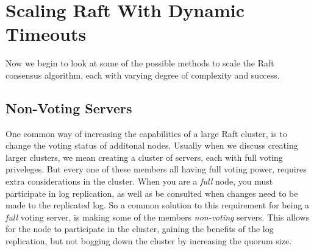 \section{Scaling Raft With Dynamic Timeouts}

Now we begin to look at some of the possible methods to scale the Raft consensus algorithm, each with varying degree of complexity and success.

\subsection{Non-Voting Servers}

One common way of increasing the capabilities of a large Raft cluster, is to change the voting status of additonal nodes.
Usually when we discuss creating larger clusters, we mean creating a cluster of servers, each with full voting priveleges.
But every one of these members all having full voting power, requires extra considerations in the cluster.
When you are a \textit{full} node, you must participate in log replication, as well as be consulted when changes need to be made to the replicated log.
So a common solution to this requirement for being a \textit{full} voting server, is making some of the members \textit{non-voting} servers.
This allows for the node to participate in the cluster, gaining the benefits of the log replication, but not bogging down the cluster by increasing the quorum size.